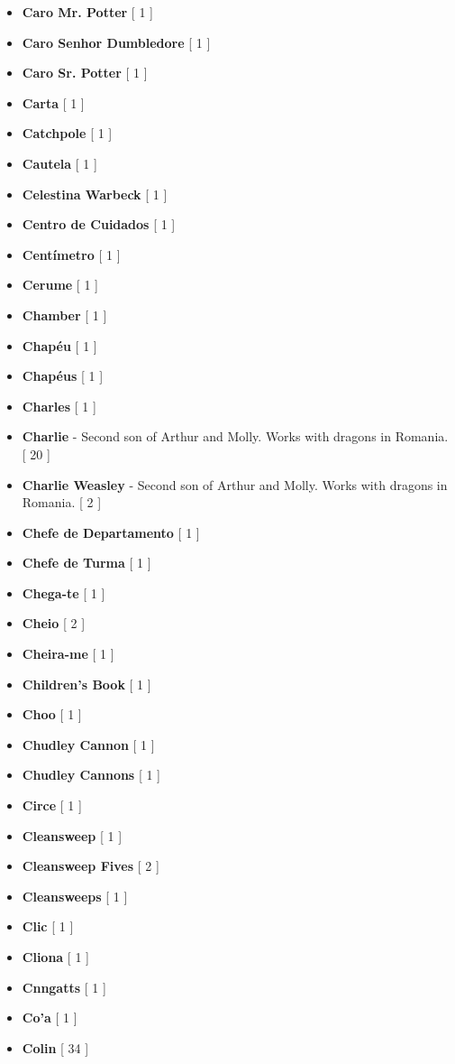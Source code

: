 \documentclass[a4paper]{article}
\begin{document}
{\begin{itemize}
	\item \textbf{Caro Mr. Potter} [ 1 ]
	\item \textbf{Caro Senhor Dumbledore} [ 1 ]
	\item \textbf{Caro Sr. Potter} [ 1 ]
	\item \textbf{Carta} [ 1 ]
	\item \textbf{Catchpole} [ 1 ]
	\item \textbf{Cautela} [ 1 ]
	\item \textbf{Celestina Warbeck} [ 1 ]
	\item \textbf{Centro de Cuidados} [ 1 ]
	\item \textbf{Centímetro} [ 1 ]
	\item \textbf{Cerume} [ 1 ]
	\item \textbf{Chamber} [ 1 ]
	\item \textbf{Chapéu} [ 1 ]
	\item \textbf{Chapéus} [ 1 ]
	\item \textbf{Charles} [ 1 ]
	\item \textbf{Charlie} - Second son of Arthur and Molly. Works with dragons in Romania. [ 20 ]
	\item \textbf{Charlie Weasley} - Second son of Arthur and Molly. Works with dragons in Romania. [ 2 ]
	\item \textbf{Chefe de Departamento} [ 1 ]
	\item \textbf{Chefe de Turma} [ 1 ]
	\item \textbf{Chega-te} [ 1 ]
	\item \textbf{Cheio} [ 2 ]
	\item \textbf{Cheira-me} [ 1 ]
	\item \textbf{Children's Book} [ 1 ]
	\item \textbf{Choo} [ 1 ]
	\item \textbf{Chudley Cannon} [ 1 ]
	\item \textbf{Chudley Cannons} [ 1 ]
	\item \textbf{Circe} [ 1 ]
	\item \textbf{Cleansweep} [ 1 ]
	\item \textbf{Cleansweep Fives} [ 2 ]
	\item \textbf{Cleansweeps} [ 1 ]
	\item \textbf{Clic} [ 1 ]
	\item \textbf{Cliona} [ 1 ]
	\item \textbf{Cnngatts} [ 1 ]
	\item \textbf{Co'a} [ 1 ]
	\item \textbf{Colin} [ 34 ]

\end{itemize}}
\end{document}
